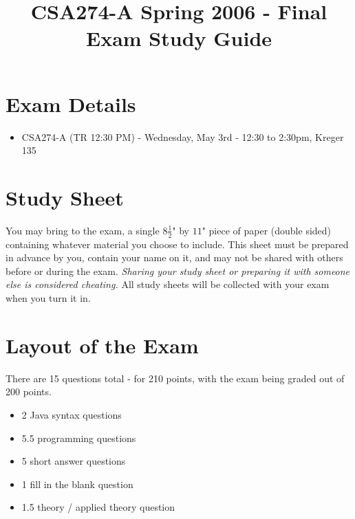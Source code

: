 \documentclass[10pt]{article}
\title{CSA274-A Spring 2006 - Final Exam Study Guide}
\date{ }
\newif\ifpdf
\begin{document}
\ifpdf
\DeclareGraphicsExtensions{.pdf, .jpg, .tif}
\else
{}
\fi

\maketitle

\section{Exam Details}
\begin{itemize}
	\item CSA274-A (TR 12:30 PM) - Wednesday, May 3rd - 12:30 to 2:30pm, Kreger 135
\end{itemize}

\section{Study Sheet}
You may bring to the exam, a single $8\frac{1}{2}$" by $11$" piece of paper (double sided) containing whatever material you choose to include.   This sheet must be prepared in advance by you, contain your name on it, and may not be shared with others before or during the exam.  {\it Sharing your study sheet or preparing it with someone else is considered cheating.} All study sheets will be collected with your exam when you turn it in.

\section{Layout of the Exam}
There are 15 questions total - for 210 points, with the exam being graded out of 200 points.   

\begin{itemize}
  \item 2 Java syntax questions
  \item 5.5 programming questions
  \item 5 short answer questions
  \item 1 fill in the blank question
  \item 1.5 theory / applied theory question
\end{itemize}
\end{document}
